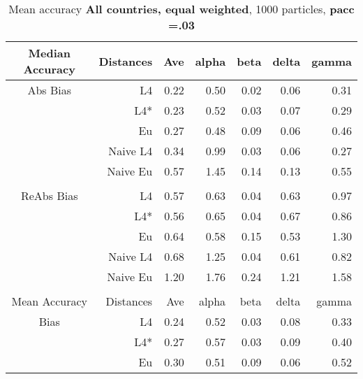 \documentclass[a4paper,12pt,twoside]{book}
\begin{document}


\begin{table}[H]

\centering
\vfill
\vspace{2cm}
\caption{Mean  accuracy \textbf{All countries, equal weighted}, 1000 particles, \textbf{pacc =.03}}


\begin{tabular}{crrrrrr}

  \hline
  
{\color{blue}Median Accuracy} & Distances & Ave & alpha & beta & delta & gamma \\ 
  \hline
{\color{blue}Abs Bias} & L4  &0.22 & 0.50 & 0.02 & 0.06 & 0.31 \\ 
 
&L4*  & 0.23 & 0.52 & 0.03 & 0.07 & 0.29 \\ 
  
&Eu &   0.27 & 0.48 & 0.09 & 0.06 & 0.46 \\ 
 
&Naive L4&     0.34 & 0.99 & 0.03 & 0.06 & 0.27 \\ 
  
&Naive Eu &   0.57 & 1.45 & 0.14 & 0.13 & 0.55 \\\\ 
  
   \hline
   
{\color{blue} ReAbs Bias } & L4  &0.57 & 0.63 & 0.04 & 0.63 & 0.97 \\ 
 
&L4*  & 0.56 & 0.65 & 0.04 & 0.67 & 0.86 \\ 
  
&Eu &   
   0.64 & 0.58 & 0.15 & 0.53 & 1.30 \\ 
  
&Naive L4&   
  0.68 & 1.25 & 0.04 & 0.61 & 0.82 \\
&Naive Eu &   1.20 & 1.76 & 0.24 & 1.21 & 1.58 \\ \\
  
   \hline
{\color{blue}Mean Accuracy} & Distances & Ave & alpha & beta & delta & gamma \\ 
  \hline
{\color{blue}Bias} & L4  &0.24 & 0.52 & 0.03 & 0.08 & 0.33 \\ 
  
&L4*  & 0.27 & 0.57 & 0.03 & 0.09 & 0.40 \\ 
  
  
&Eu &   0.30 & 0.51 & 0.09 & 0.06 & 0.52 \\ 
  

\end{tabular}
\end{table}
\end{document}
